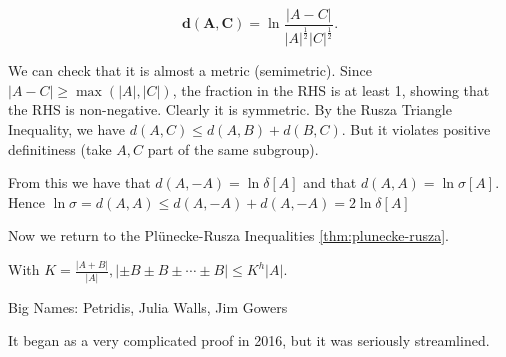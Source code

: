 \documentclass[a4paper]{article}
\begin{document}
\begin{definition}
	\[
		\bm{d(A,C)} = \ln \frac{|A-C|}{|A|^{\frac{1}{2}}|C|^{\frac{1}{2}}  }
	.\]
\end{definition}

We can check that it is almost a metric (semimetric).
Since $|A-C| \ge \max(|A|,|C|) $, the fraction in the RHS is at least 1, showing that the RHS is non-negative.
Clearly it is symmetric.
By the Rusza Triangle Inequality, we have $d(A,C) \le d(A,B) + d(B,C) $.
But it violates positive definitiness (take $A,C $ part of the same subgroup).

From this we have that $d(A,-A) = \ln \delta[A] $ and that $d(A,A) = \ln \sigma [A] $.
Hence $\ln \sigma = d(A,A) \le d(A,-A) + d(A,-A) = 2\ln \delta [A] $

Now we return to the Pl\"unecke-Rusza Inequalities \ref{thm:plunecke-rusza}.

\begin{thm}
	With $K = \frac{|A+B|}{|A|}, |\pm B \pm B \pm \cdots \pm B| \le K^{h}|A|  $.
\end{thm}

Big Names: Petridis, Julia Walls, Jim Gowers

It began as a very complicated proof in 2016, but it was seriously streamlined.
\end{document}
